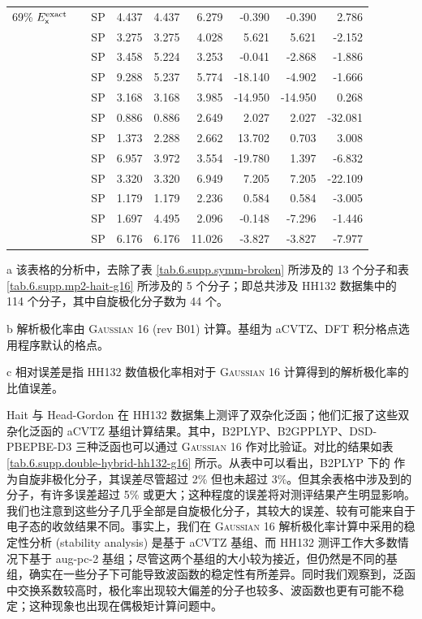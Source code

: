 \begin{table}[!htp]
{\begin{tabular}{llld{1.3}d{1.3}d{1.3}d{3.3}d{3.3}d{3.3}}
    69\% $E_{\textsf{x}}^\mathrm{exact}$ &  & SP  & 4.437 & 4.437 & 6.279  & -0.390  & -0.390  & 2.786   \\
    &  & SP  & 3.275 & 3.275 & 4.028  & 5.621   & 5.621   & -2.152  \\
    &  & SP  & 3.458 & 5.224 & 3.253  & -0.041  & -2.868  & -1.886  \\
    &  & SP  & 9.288 & 5.237 & 5.774  & -18.140 & -4.902  & -1.666  \\
    &  & SP  & 3.168 & 3.168 & 3.985  & -14.950 & -14.950 & 0.268   \\
    &  & SP  & 0.886 & 0.886 & 2.649  & 2.027   & 2.027   & -32.081 \\
    &  & SP  & 1.373 & 2.288 & 2.662  & 13.702  & 0.703   & 3.008   \\
    &  & SP  & 6.957 & 3.972 & 3.554  & -19.780 & 1.397   & -6.832  \\
    &  & SP  & 3.320 & 3.320 & 6.949  & 7.205   & 7.205   & -22.109 \\
    &  & SP  & 1.179 & 1.179 & 2.236  & 0.584   & 0.584   & -3.005  \\
    &  & SP  & 1.697 & 4.495 & 2.096  & -0.148  & -7.296  & -1.446  \\
    &  & SP  & 6.176 & 6.176 & 11.026 & -3.827  & -3.827  & -7.977  \\
    \bottomrule
    \end{tabular}
}{
    \item[a] 该表格的分析中，去除了表 \ref{tab.6.supp.symm-broken} 所涉及的 13 个分子和表 \ref{tab.6.supp.mp2-hait-g16} 所涉及的 5 个分子；即总共涉及 HH132 数据集中的 114 个分子，其中自旋极化分子数为 44 个。
    \item[b] 解析极化率由 \textsc{Gaussian 16} (rev B01)\cite{Gaussian16} 计算。基组为 aCVTZ、DFT 积分格点选用程序默认的格点。
    \item[c] 相对误差是指 HH132 数值极化率相对于 \textsc{Gaussian 16} 计算得到的解析极化率的比值误差。
}
\end{table}

Hait 与 Head-Gordon 在 HH132 数据集上测评了双杂化泛函\cite{Hait-Head-Gordon.PCCP.2018}；他们汇报了这些双杂化泛函的 aCVTZ 基组计算结果。其中，B2PLYP、B2GPPLYP、DSD-PBEPBE-D3 三种泛函也可以通过 \textsc{Gaussian 16} 作对比验证。对比的结果如表 \ref{tab.6.supp.double-hybrid-hh132-g16} 所示。从表中可以看出，B2PLYP 下的  作为自旋非极化分子，其误差尽管超过 2\% 但也未超过 3\%。但其余表格中涉及到的分子，有许多误差超过 5\% 或更大；这种程度的误差将对测评结果产生明显影响。我们也注意到这些分子几乎全部是自旋极化分子，其较大的误差、较有可能来自于电子态的收敛结果不同。事实上，我们在 \textsc{Gaussian 16} 解析极化率计算中采用的稳定性分析 (stability analysis) 是基于 aCVTZ 基组、而 HH132 测评工作大多数情况下基于 aug-pc-2 基组\cite{Hait-Head-Gordon.PCCP.2018}；尽管这两个基组的大小较为接近，但仍然是不同的基组，确实在一些分子下可能导致波函数的稳定性有所差异。同时我们观察到，泛函中交换系数较高时，极化率出现较大偏差的分子也较多、波函数也更有可能不稳定；这种现象也出现在偶极矩计算问题中\cite{Gu-Xu.JCTC.2021a}。


